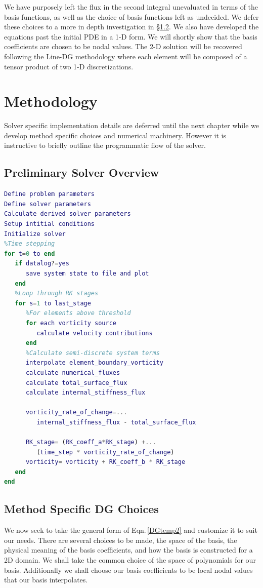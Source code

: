 \documentclass[letterpaper,12pt]{report}
\begin{document}
We have purposely left the flux in the second integral unevaluated in terms of the basis functions, as well as the choice of basis functions left as undecided. We defer these choices to a more in depth investigation in \S \ref{DGchoice}. We also have developed the equations past the initial PDE in a 1-D form. We will shortly show that the basis coefficients are chosen to be nodal values. The 2-D solution will be recovered following the Line-DG methodology \cite{Persson2013} where each element will be composed of a tensor product of two 1-D discretizations.

\chapter{Methodology}
Solver specific implementation details are deferred until the next chapter while we develop method specific choices and numerical machinery. However it is instructive to briefly outline the programmatic flow of the solver.
\section{Preliminary Solver Overview}\label{Pseudo1}
\vspace{-1cm}
\singlespacing
\begin{lstlisting}[language=Matlab]
Define problem parameters
Define solver parameters
Calculate derived solver parameters
Setup intitial conditions
Initialize solver
%Time stepping
for t=0 to end
   if datalog?=yes
      save system state to file and plot
   end
   %Loop through RK stages
   for s=1 to last_stage
      %For elements above threshold
      for each vorticity source
         calculate velocity contributions
      end
      %Calculate semi-discrete system terms
      interpolate element_boundary_vorticity
      calculate numerical_fluxes
      calculate total_surface_flux
      calculate internal_stiffness_flux
		
      vorticity_rate_of_change=...
         internal_stiffness_flux - total_surface_flux
		
      RK_stage= (RK_coeff_a*RK_stage) +...
         (time_step * vorticity_rate_of_change)
      vorticity= vorticity + RK_coeff_b * RK_stage
   end
end
\end{lstlisting}
\doublespacing

%
\section{Method Specific DG Choices} \label{DGchoice}
We now seek to take the general form of Eqn.\,\eqref{DGtemp2} and customize it to suit our needs. There are several choices to be made, the space of the basis, the physical meaning of the basis coefficients, and how the basis is constructed for a 2D domain. We shall take the common choice of the space of polynomials for our basis. Additionally we shall choose our basis coefficients to be local nodal values that our basis interpolates.
\end{document}
